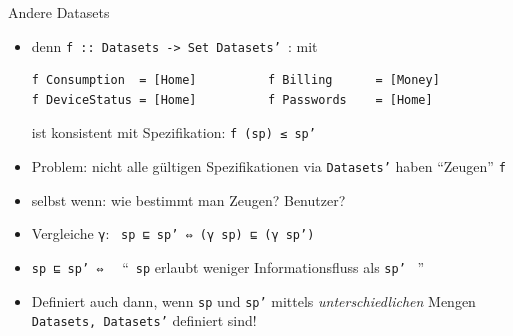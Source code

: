 \documentclass[18pt]{beamer}
\begin{document}
\begin{frame}[fragile]{Andere Datasets}
\begin{overprint}
\begin{center}
\end{center}


\begin{center}
\end{center}


\end{overprint}

\begin{overprint}
\begin{itemize}
  \item denn \texttt{f :: Datasets -> Set Datasets' }: mit
\begin{verbatim}
f Consumption  = [Home]          f Billing      = [Money]
f DeviceStatus = [Home]          f Passwords    = [Home]
\end{verbatim}
        ist konsistent mit Spezifikation: \texttt{f (sp) ≤ sp'}
\end{itemize}

\begin{itemize}
  \item Problem: nicht alle gültigen Spezifikationen via \texttt{Datasets'} haben \enquote{Zeugen} \texttt{f}
  \item selbst wenn: wie bestimmt man Zeugen? Benutzer?
\end{itemize}

\begin{itemize}
  \item Vergleiche \texttt{γ}: \ \texttt{sp  ⊑ sp'  ⇔ (γ sp) ⊑ (γ sp')}
  \item \texttt{sp  ⊑ sp'  ⇔ } \  \enquote{\ \texttt{sp} erlaubt weniger Informationsfluss als \texttt{sp'} \ }
  \item Definiert auch dann, wenn \texttt{sp} und \texttt{sp'} mittels  \emph{unterschiedlichen} Mengen \texttt{Datasets, Datasets'} definiert sind!
\end{itemize}
\end{overprint}

\end{frame}
\end{document}
